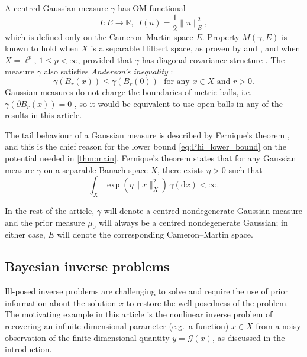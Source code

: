 \documentclass[11pt]{article}
\newcommand*{\cball}[2]{B_{#2}(#1)}
\newcommand*{\defterm}{\emph}%
\newcommand*{\rd}{\mathrm{d}}
\newcommand*{\Reals}{\mathbb{R}}
\renewcommand*{\leq}{\leqslant}
\newcommand*{\crcdfm}[3]{#1(\cball{#2}{#3})}
\theoremstyle{plain}
\theoremstyle{definition}
\newcommand{\norm}[1]{\lVert #1 \rVert}
\numberwithin{equation}{section}
\numberwithin{figure}{section}
\numberwithin{table}{section}
\begin{document}
A centred Gaussian measure $\gamma$ has OM functional
\begin{equation} \label{eq:Gaussian_OM}
	I \colon E \to \Reals,~~I(u) = \frac{1}{2} \norm{u}_{E}^{2},
\end{equation}
which is defined only on the Cameron--Martin space $E$.
Property $M(\gamma, E)$ is known to hold when $X$ is a separable Hilbert space, as proven by \citet[Corollary~3.8]{DashtiLawStuartVoss2013} and \citet[Corollary~5.2]{AyanbayevKlebanovLieSullivan2022a}, and when $X = \ell^p$, $1 \leq p < \infty$, provided that $\gamma$ has diagonal covariance structure \citep[Lemma~4.5]{KlebanovWacker2022}.
The measure $\gamma$ also satisfies \defterm{Anderson's inequality} \citep[Theorem~2.8.10]{Bogachev1998}:
\begin{equation} \label{eq:Anderson_inequality}
	\crcdfm{\gamma}{x}{r} \leq \crcdfm{\gamma}{0}{r} \text{~~for any $x \in X$ and $r > 0$.}
\end{equation}
Gaussian measures do not charge the boundaries of metric balls, i.e.\ $\gamma(\partial \cball{x}{r}) = 0$ \citep[see e.g.][Lemma~6.1]{AgapiouBurgerDashtiHelin2018}, so it would be equivalent to use open balls in any of the results in this article.

The tail behaviour of a Gaussian measure is described by Fernique's theorem \citep{Fernique1970}, and this is the chief reason for the lower bound \eqref{eq:Phi_lower_bound} on the potential needed in \cref{thm:main}. 
Fernique's theorem states that for any Gaussian measure $\gamma$ on a separable Banach space $X$, there exists $\eta > 0$ such that
\begin{equation*}
	\int_X \exp\left(\eta \norm{x}_X^2\right) \,\gamma(\rd x) < \infty.
\end{equation*}

In the rest of the article, $\gamma$ will denote a centred nondegenerate Gaussian measure and the prior measure $\mu_0$ will always be a centred nondegenerate Gaussian;
in either case, $E$ will denote the corresponding Cameron--Martin space.

\subsection{Bayesian inverse problems}
\label{sec:BIPs}

Ill-posed inverse problems are challenging to solve and require the use of prior information about the solution $x$ to restore the well-posedness of the problem.
The motivating example in this article is the nonlinear inverse problem of recovering an infinite-dimensional parameter (e.g.\ a function) $x \in X$ from a noisy observation of the finite-dimensional quantity $y = \mathcal{G}(x)$, as discussed in the introduction.
\end{document}
